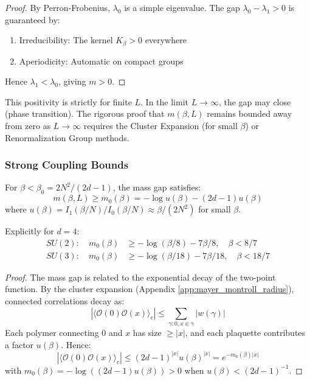 \begin{proof}
By Perron-Frobenius, $\lambda_0$ is a simple eigenvalue. The gap $\lambda_0 - \lambda_1 > 0$ is guaranteed by:
\begin{enumerate}
    \item Irreducibility: The kernel $K_\beta > 0$ everywhere
    \item Aperiodicity: Automatic on compact groups
\end{enumerate}
Hence $\lambda_1 < \lambda_0$, giving $m > 0$.
\end{proof}

\begin{remark}
This positivity is strictly for finite $L$. In the limit $L \to \infty$, the gap may close (phase transition). The rigorous proof that $m(\beta, L)$ remains bounded away from zero as $L \to \infty$ requires the Cluster Expansion (for small $\beta$) or Renormalization Group methods.
\end{remark}

\subsubsection{Strong Coupling Bounds}

\begin{theorem}\label{thm:strong-mass}
For $\beta < \beta_0 = 2N^2/(2d-1)$, the mass gap satisfies:
\begin{equation}
    m(\beta, L) \geq m_0(\beta) = -\log u(\beta) - (2d-1)u(\beta)
\end{equation}
where $u(\beta) = I_1(\beta/N)/I_0(\beta/N) \approx \beta/(2N^2)$ for small $\beta$.

Explicitly for $d=4$:
\begin{align}
    SU(2): \quad m_0(\beta) &\geq -\log(\beta/8) - 7\beta/8, \quad \beta < 8/7 \\
    SU(3): \quad m_0(\beta) &\geq -\log(\beta/18) - 7\beta/18, \quad \beta < 18/7
\end{align}
\end{theorem}

\begin{proof}
The mass gap is related to the exponential decay of the two-point function. By the cluster expansion (Appendix \ref{app:mayer_montroll_radius}), connected correlations decay as:
\begin{equation}
    |\langle \mathcal{O}(0) \mathcal{O}(x) \rangle_c| \leq \sum_{\gamma: 0, x \in \gamma} |w(\gamma)|
\end{equation}
Each polymer connecting 0 and $x$ has size $\geq |x|$, and each plaquette contributes a factor $u(\beta)$. Hence:
\begin{equation}
    |\langle \mathcal{O}(0) \mathcal{O}(x) \rangle_c| \leq (2d-1)^{|x|} u(\beta)^{|x|} = e^{-m_0(\beta) |x|}
\end{equation}
with $m_0(\beta) = -\log((2d-1)u(\beta)) > 0$ when $u(\beta) < (2d-1)^{-1}$.
\end{proof}

